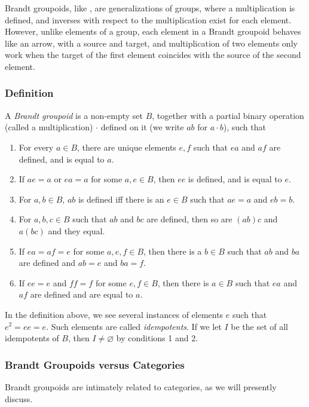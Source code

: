 \documentclass[12pt]{article}
\begin{document}
Brandt groupoids, like , are generalizations of groups, where a multiplication is defined, and inverses with respect to the multiplication exist for each element.  However, unlike elements of a group, each element in a Brandt groupoid behaves like an arrow, with a source and target, and multiplication of two elements only work when the target of the first element coincides with the source of the second element.

\subsubsection*{Definition}

A \emph{Brandt groupoid} is a non-empty set $B$, together with a partial binary operation (called a multiplication) $\cdot$ defined on it (we write $ab$ for $a\cdot b$), such that
\begin{enumerate}
\item For every $a\in B$, there are unique elements $e,f$ such that $ea$ and $af$ are defined, and is equal to $a$.
\item If $ae=a$ or $ea=a$ for some $a,e\in B$, then $ee$ is defined, and is equal to $e$.
\item For $a,b\in B$, $ab$ is defined iff there is an $e\in B$ such that $ae=a$ and $eb=b$.
\item For $a,b,c\in B$ such that $ab$ and $bc$ are defined, then so are $(ab)c$ and $a(bc)$ and they equal.
\item If $ea=af=e$ for some $a,e,f\in B$, then there is a $b\in B$ such that $ab$ and $ba$ are defined and $ab=e$ and $ba=f$.
\item If $ee=e$ and $ff=f$ for some $e,f\in B$, then there is $a\in B$ such that $ea$ and $af$ are defined and are equal to $a$.
\end{enumerate}

In the definition above, we see several instances of elements $e$ such that $e^2=ee=e$.  Such elements are called \emph{idempotents}.  If we let $I$ be the set of all idempotents of $B$, then $I\ne \varnothing$ by conditions 1 and 2.

\subsubsection*{Brandt Groupoids versus Categories}

Brandt groupoids are intimately related to categories, as we will presently discuss.
\end{document}
